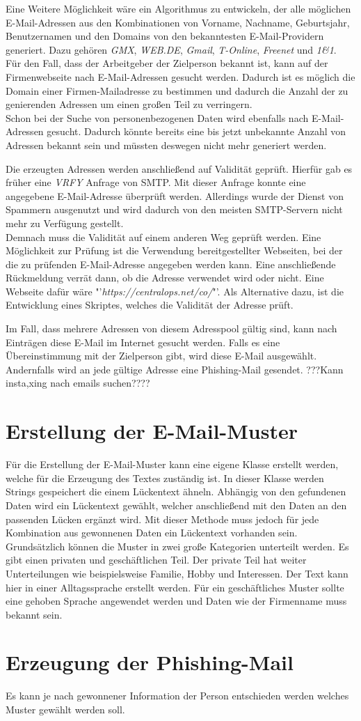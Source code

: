 Eine Weitere Möglichkeit wäre ein Algorithmus zu entwickeln, der alle möglichen E-Mail-Adressen aus den Kombinationen von Vorname, Nachname, Geburtsjahr, Benutzernamen und den Domains von den bekanntesten E-Mail-Providern generiert. Dazu gehören \textit{GMX}, \textit{WEB.DE}, \textit{Gmail}, \textit{T-Online}, \textit{Freenet} und \textit{1\&1}.\cite{AnbieterMail} \\
Für den Fall, dass der Arbeitgeber der Zielperson bekannt ist, kann auf der Firmenwebseite nach E-Mail-Adressen gesucht werden. Dadurch ist es möglich die Domain einer Firmen-Mailadresse zu bestimmen und dadurch die Anzahl der zu genierenden Adressen um einen großen Teil zu verringern.\\
Schon bei der Suche von personenbezogenen Daten wird ebenfalls nach E-Mail-Adressen gesucht. Dadurch könnte bereits eine bis jetzt unbekannte Anzahl von Adressen bekannt sein und müssten deswegen nicht mehr generiert werden.

Die erzeugten Adressen werden anschließend auf Validität geprüft. Hierfür gab es früher eine \textit{VRFY} Anfrage von SMTP. Mit dieser Anfrage konnte eine angegebene E-Mail-Adresse überprüft werden. Allerdings wurde der Dienst von Spammern ausgenutzt und wird dadurch von den meisten SMTP-Servern nicht mehr zu Verfügung gestellt.\cite{balduzzi2010abusing}\\
Demnach muss die Validität auf einem anderen Weg geprüft werden. Eine Möglichkeit zur Prüfung ist die Verwendung bereitgestellter Webseiten, bei der die zu prüfenden E-Mail-Adresse angegeben werden kann. Eine anschließende Rückmeldung verrät dann, ob die Adresse verwendet wird oder nicht. Eine Webseite dafür wäre "'\textit{https://centralops.net/co/}"'. Als Alternative dazu, ist die Entwicklung eines Skriptes, welches die Validität der Adresse prüft.

Im Fall, dass mehrere Adressen von diesem Adresspool gültig sind, kann nach Einträgen diese E-Mail im Internet gesucht werden. Falls es eine Übereinstimmung mit der Zielperson gibt, wird diese E-Mail ausgewählt. Andernfalls wird an jede gültige Adresse eine Phishing-Mail gesendet. 
???Kann insta,xing nach emails suchen????
\section{Erstellung der E-Mail-Muster}
Für die Erstellung der E-Mail-Muster kann eine eigene Klasse erstellt werden, welche für die Erzeugung des Textes zuständig ist. In dieser Klasse werden Strings gespeichert die einem Lückentext ähneln. Abhängig von den gefundenen Daten wird ein Lückentext gewählt, welcher anschließend mit den Daten an den passenden Lücken ergänzt wird. Mit dieser Methode muss jedoch für jede Kombination aus gewonnenen Daten ein Lückentext vorhanden sein.\\
Grundsätzlich können die Muster in zwei große Kategorien unterteilt werden. Es gibt einen privaten und geschäftlichen Teil. Der private Teil hat weiter Unterteilungen wie beispielsweise Familie, Hobby und Interessen. Der Text kann hier in einer Alltagssprache erstellt werden. Für ein geschäftliches Muster sollte eine gehoben Sprache angewendet werden und Daten wie der Firmenname muss bekannt sein. 
\section{Erzeugung der Phishing-Mail}
Es kann je nach gewonnener Information der Person entschieden werden welches Muster gewählt werden soll.